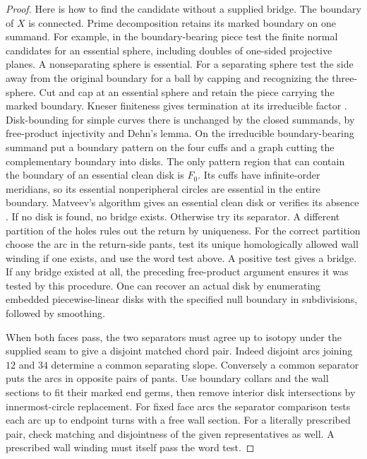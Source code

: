 \documentclass[11pt,letterpaper]{article}
\numberwithin{equation}{section}
\theoremstyle{remark}
\begin{document}
\begin{proof}
Here is how to find the candidate without a supplied bridge. The
boundary of \(X\) is connected. Prime decomposition retains its
marked boundary on one summand. For example, in the boundary-bearing
piece test the finite normal candidates for an essential sphere,
including doubles of one-sided projective planes. A nonseparating
sphere is essential. For a separating sphere test the side away
from the original boundary for a ball by capping and recognizing
the three-sphere. Cut and cap at an essential sphere and retain
the piece carrying the marked boundary. Kneser finiteness gives
termination at its irreducible factor
\cite[Theorem 4.1.12 and Chapter 5]{Matveev2007Algorithmic}. Disk-bounding for simple curves
there is unchanged by the closed summands, by free-product
injectivity and Dehn's lemma. On the irreducible boundary-bearing
summand put a boundary pattern on the four cuffs and a graph cutting
the complementary boundary into disks. The only pattern region that
can contain the boundary of an essential clean disk is \(F_0\).
Its cuffs have infinite-order meridians, so its essential
nonperipheral circles are essential in the entire boundary.
Matveev's algorithm gives an essential clean disk or verifies its
absence \cite[Theorem 4.1.13]{Matveev2007Algorithmic}.
If no disk is found, no bridge exists. Otherwise try its separator.
A different partition of the holes rules out the return by uniqueness.
For the correct partition choose the arc in the return-side pants,
test its unique homologically allowed wall winding if one exists,
and use the word test above. A positive test gives a bridge.
If any bridge existed at all, the preceding free-product argument
ensures it was tested by this procedure. One can recover an actual
disk by enumerating embedded piecewise-linear disks with the
specified null boundary in subdivisions, followed by smoothing.

When both faces pass, the two separators must agree up to isotopy
under the supplied seam to give a disjoint matched chord pair.
Indeed disjoint arcs joining \(12\) and \(34\) determine a common
separating slope. Conversely a common separator puts the arcs in
opposite pairs of pants. Use boundary collars and the wall sections
to fit their marked end germs, then remove interior disk intersections
by innermost-circle replacement. For fixed face arcs the separator comparison tests each arc up to
endpoint turns with a free wall section. For a literally prescribed
pair, check matching and disjointness of the given representatives
as well. A prescribed wall winding must itself pass the word test.
\end{proof}
\end{document}
